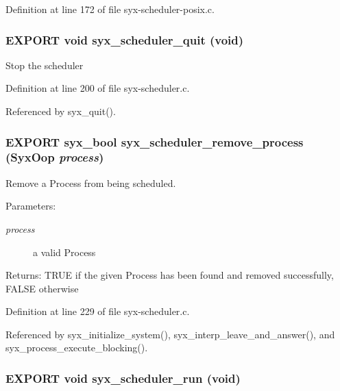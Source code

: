 Definition at line 172 of file syx-scheduler-posix.c.\hypertarget{syx-scheduler_8h_4bc3cad9e3d276d535f8d53e33c59501}{
\subsubsection{\setlength{\rightskip}{0pt plus 5cm}EXPORT void syx\_\-scheduler\_\-quit (void)}}
\label{syx-scheduler_8h_4bc3cad9e3d276d535f8d53e33c59501}


Stop the scheduler 

Definition at line 200 of file syx-scheduler.c.

Referenced by syx\_\-quit().\hypertarget{syx-scheduler_8h_382b95da8a6469cf53510b05ae655f5e}{
\subsubsection{\setlength{\rightskip}{0pt plus 5cm}EXPORT {\bf syx\_\-bool} syx\_\-scheduler\_\-remove\_\-process ({\bf SyxOop} {\em process})}}
\label{syx-scheduler_8h_382b95da8a6469cf53510b05ae655f5e}


Remove a Process from being scheduled. \begin{Desc}
\item[Parameters:]
\begin{description}
\item[{\em process}]a valid Process \end{description}
\end{Desc}
\begin{Desc}
\item[Returns:]TRUE if the given Process has been found and removed successfully, FALSE otherwise \end{Desc}


Definition at line 229 of file syx-scheduler.c.

Referenced by syx\_\-initialize\_\-system(), syx\_\-interp\_\-leave\_\-and\_\-answer(), and syx\_\-process\_\-execute\_\-blocking().\hypertarget{syx-scheduler_8h_25f4d9193e601faf10f5937fb7c6b32e}{
\subsubsection{\setlength{\rightskip}{0pt plus 5cm}EXPORT void syx\_\-scheduler\_\-run (void)}}
\label{syx-scheduler_8h_25f4d9193e601faf10f5937fb7c6b32e}


